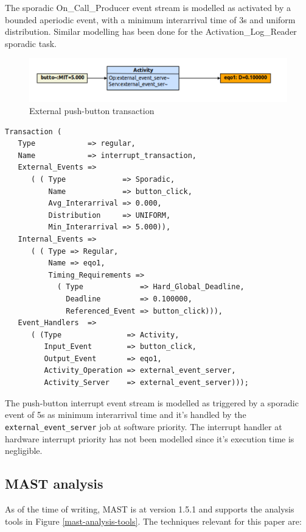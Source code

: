 \documentclass{article}
\begin{document}
The sporadic On\_Call\_Producer event stream is modelled as activated by a bounded aperiodic event, with a minimum interarrival time of 3s and uniform distribution. Similar modelling has been done for the Activation\_Log\_Reader sporadic task.

\begin{figure}[!htbp]
\centering
\includegraphics[width=5in]{images/transaction-eq}
\caption{External push-button transaction}
\label{transaction-eq}
\end{figure}

\begin{lstlisting}
Transaction (
   Type            => regular,
   Name            => interrupt_transaction,
   External_Events =>
      ( ( Type             => Sporadic,
          Name             => button_click,
          Avg_Interarrival => 0.000,
          Distribution     => UNIFORM,
          Min_Interarrival => 5.000)),
   Internal_Events =>
      ( ( Type => Regular,
          Name => eqo1,
          Timing_Requirements =>
            ( Type             => Hard_Global_Deadline,
              Deadline         => 0.100000,
              Referenced_Event => button_click))),
   Event_Handlers  =>
      ( (Type               => Activity,
         Input_Event        => button_click,
         Output_Event       => eqo1,
         Activity_Operation => external_event_server,
         Activity_Server    => external_event_server)));
\end{lstlisting}

The push-button interrupt event stream is modelled as triggered by a sporadic event of 5s as minimum interarrival time and it's handled by the \texttt{external\_event\_server} job at software priority. The interrupt handler at hardware interrupt priority has not been modelled since it's execution time is negligible.

\subsection{MAST analysis}\label{mast-analysis}

As of the time of writing, MAST is at version 1.5.1 and supports the analysis tools \cite{mast-analysis} in Figure \ref{mast-analysis-tools}. The techniques relevant for this paper are:
\end{document}
